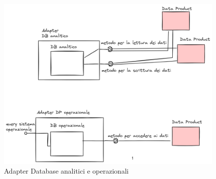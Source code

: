 \documentclass[12pt]{report}
\begin{document}
\begin{figure}
    \centering
    \includegraphics[width =\linewidth]{immagini/Data Mesh con DB Adapter 2024-03-06 17.45.31.excalidraw.png}
    \caption{Adapter Database analitici e operazionali}
    \label{fig:AdapterDB}
\end{figure}
\end{document}
